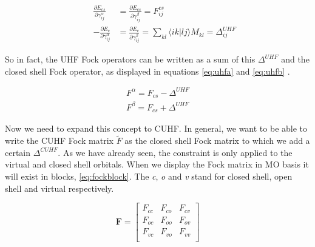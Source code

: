 \documentclass[twoside,twocolumn,9pt]{article}
\begin{document}
\begin{subequations}
  \begin{align}
    \label{eq:der1}
     &  & \frac{\partial E_{cs}}{\partial \gamma^\alpha_{ij}} & = \frac{\partial E_{cs}}{\partial \gamma^\beta_{ij}} = F^{cs}_{ij}                                             \\
    \label{eq:der2}
     &  & -\frac{\partial E_c}{\partial \gamma^\alpha_{ij}}   & = \frac{\partial E_c}{\partial \gamma^\beta_{ij}} = \sum_{kl} \langle ik|lj \rangle M_{kl} = \Delta^{UHF}_{ij}
  \end{align}
\end{subequations}

So in fact, the UHF Fock operators can be written as a sum of this $\Delta^{UHF}$ and the closed shell Fock operator, as displayed in equations \eqref{eq:uhfa} and \eqref{eq:uhfb}
\cite{Scuseria2010}.

\begin{subequations}
  \begin{align}
    \label{eq:uhfa}
    F^\alpha = F_{cs} - \Delta^{UHF} \\
    \label{eq:uhfb}
    F^\beta = F_{cs} + \Delta^{UHF}
  \end{align}
\end{subequations}

Now we need to expand this concept to CUHF. In general, we want
to be able to write the CUHF Fock matrix $\tilde{F}$ as the closed shell Fock matrix to which we add a certain $\Delta^{CUHF}$. As we have already seen, the constraint is only
applied to the virtual and closed shell orbitals. When we display the Fock matrix in MO basis it will exist in blocks, \eqref{eq:fockblock}. The \textit{c}, \textit{o} and \textit{v}
stand for closed shell, open shell and virtual respectively.

\begin{equation}\label{eq:fockblock}
  \mathbf{F} = \begin{bmatrix}
    F_{cc} & F_{co} & F_{cv} \\
    F_{oc} & F_{oo} & F_{ov} \\
    F_{vc} & F_{vo} & F_{vv} \\
  \end{bmatrix}
\end{equation}
\end{document}
